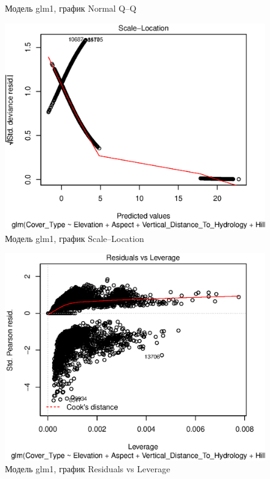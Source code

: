 \documentclass[12pt]{article}
\begin{document}
\begin{multicols}{1}
\begin{figure}[H]
\caption{Модель glm1, график Normal Q--Q}
\label{fig:glm1_2}
\end{figure}
\begin{figure}[H]
\centering
\includegraphics[width=0.9\linewidth]{glm1_3}
\caption{Модель glm1, график Scale--Location}
\label{fig:glm1_3}
\end{figure}
\begin{figure}[H]
\centering
\includegraphics[width=0.9\linewidth]{glm1_4}
\caption{Модель glm1, график Residuals vs Leverage}
\label{fig:glm1_4}
\end{figure}
\end{multicols}
\end{document}
